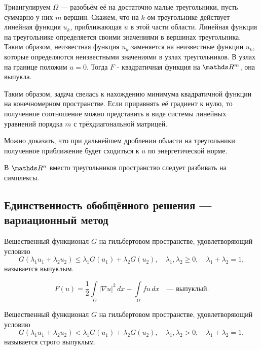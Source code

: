 Триангулируем $\Omega$ --- разобьём её на достаточно малые треугольники, пусть суммарно у них $m$ вершин. Скажем, что на $k$-ом треугольнике действует линейная функция $u_k$, приближающая $u$ в этой части области. Линейная функция на треугольнике определяется своими значениями в вершинах треугольника. Таким образом, неизвестная функция $u_k$ заменяется на неизвестные функции $u_k$, которые определяются неизвестными значениями в узлах треугольников. В узлах на границе положим $u = 0$. Тогда $F$ - квадратичная функция на $\real^m$, она выпукла.

Таким образом, задача свелась к нахождению минимума квадратичной функции на конечномерном пространстве. Если приравнять её градиент к нулю, то полученное соотношение можно представить в виде системы линейных уравнений порядка $m$ с трёхдиагональной матрицей.

Можно доказать, что при дальнейшем дроблении области на треугольники полученное приближение будет сходиться к $u$ по энергетической норме.  

В $\real^n$ вместо треугольников пространство следует разбивать на симплексы.

\subsection{Единственность обобщённого решения --- вариационный метод}

\begin{definition} Вещественный функционал $G$ на гильбертовом пространстве, удовлетворяющий условию
$$ G(\lambda_1 u_1 + \lambda_2 u_2) \leq \lambda_1 G(u_1) + \lambda_2 G(u_2), \quad \lambda_1,\lambda_2 \geq 0, \quad \lambda_1 + \lambda_2 = 1,$$
называется выпуклым.
\end{definition}

\begin{exercise}
$$ F(u) = \frac {1} {2} \int \limits_\Omega |\nabla u|^2 \, dx - \int \limits_\Omega fu \, dx \quad \text{--- выпуклый.}$$
\end{exercise}

\begin{definition} Вещественный функционал $G$ на гильбертовом пространстве, удовлетворяющий условию
$$ G(\lambda_1 u_1 + \lambda_2 u_2) < \lambda_1 G(u_1) + \lambda_2 G(u_2), \quad \lambda_1,\lambda_2 > 0, \quad \lambda_1 + \lambda_2 = 1,$$
называется строго выпуклым.
\end{definition}

